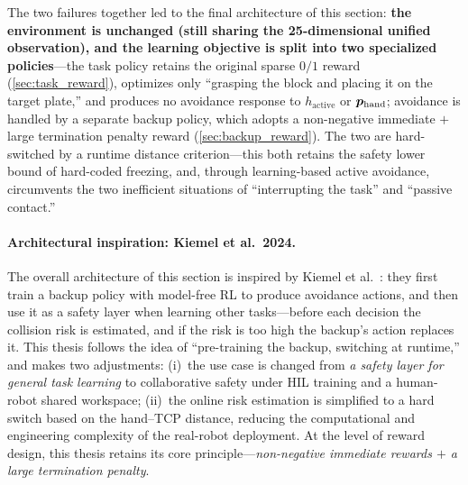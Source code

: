 The two failures together led to the final architecture of this section: \textbf{the environment is unchanged (still sharing the 25-dimensional unified observation), and the learning objective is split into two specialized policies}---the task policy retains the original sparse $0/1$ reward (\cref{sec:task_reward}), optimizes only ``grasping the block and placing it on the target plate,'' and produces no avoidance response to $h_\text{active}$ or $\bm{p}_\text{hand}$; avoidance is handled by a separate backup policy, which adopts a non-negative immediate $+$ large termination penalty reward (\cref{sec:backup_reward}). The two are hard-switched by a runtime distance criterion---this both retains the safety lower bound of hard-coded freezing, and, through learning-based active avoidance, circumvents the two inefficient situations of ``interrupting the task'' and ``passive contact.''

\paragraph{Architectural inspiration: Kiemel et al.\ 2024.} The overall architecture of this section is inspired by Kiemel et al.~\cite{kiemel2024safe}: they first train a backup policy with model-free RL to produce avoidance actions, and then use it as a safety layer when learning other tasks---before each decision the collision risk is estimated, and if the risk is too high the backup's action replaces it. This thesis follows the idea of ``pre-training the backup, switching at runtime,'' and makes two adjustments: (i)~the use case is changed from \emph{a safety layer for general task learning} to collaborative safety under HIL training and a human-robot shared workspace; (ii)~the online risk estimation is simplified to a hard switch based on the hand--TCP distance, reducing the computational and engineering complexity of the real-robot deployment. At the level of reward design, this thesis retains its core principle---\emph{non-negative immediate rewards $+$ a large termination penalty}.

